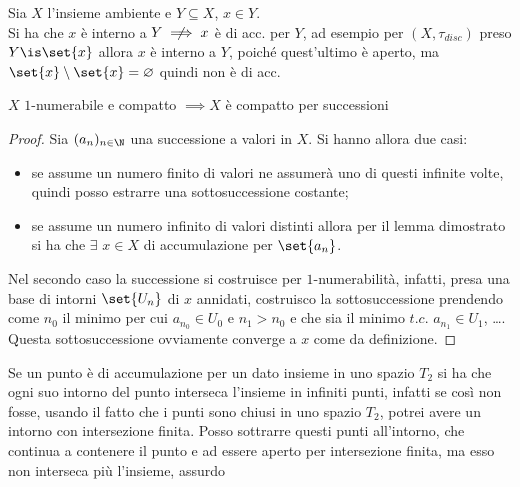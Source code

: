 

\begin{oss}
Sia $X$ l'insieme ambiente e $Y\subseteq X$, $x\in Y$.\\
Si ha che $x$ è interno a $Y \centernot\implies x$ è di acc. per $Y$, ad esempio per $(X, \tau _{disc})$ preso $Y\is \set{x}$ allora $x$ è interno a $Y$, poiché quest'ultimo è aperto, ma $\set{x}\setminus \set{x} = \varnothing$ quindi non è di acc.
\end{oss}

\begin{prop}
$X$ $1$-numerabile e compatto $\implies X$ è compatto per successioni
\end{prop}
\begin{proof}
Sia $(a_n)_{n\in\N}$ una successione a valori in $X$. Si hanno allora due casi:
\begin{itemize}
\item se assume un numero finito di valori ne assumerà uno di questi infinite volte, quindi posso estrarre una sottosuccessione costante;
\item se assume un numero infinito di valori distinti allora per il lemma dimostrato si ha che $\exists$ $x\in X$ di accumulazione per $\set{a_n}$.
\end{itemize}
Nel secondo caso la successione si costruisce per $1$-numerabilità, infatti, presa una base di intorni $\set{U_n}$ di $x$ \wlg annidati, costruisco la sottosuccessione prendendo come $n_0$ il minimo per cui $a_{n_0}\in U_0$ e $n_1 > n_0$ e che sia il minimo $t.c.$ $a_{n_1}\in U_1$, \dots . Questa sottosuccessione ovviamente converge a $x$ come da definizione.
\end{proof}

\begin{oss}
Se un punto è di accumulazione per un dato insieme in uno spazio $T_2$ si ha che ogni suo intorno del punto interseca l'insieme in infiniti punti, infatti se così non fosse, usando il fatto che i punti sono chiusi in uno spazio $T_2$, potrei avere un intorno con intersezione finita. Posso sottrarre questi punti all'intorno, che continua a contenere il punto e ad essere aperto per intersezione finita, ma esso non interseca più l'insieme, assurdo
\end{oss}

